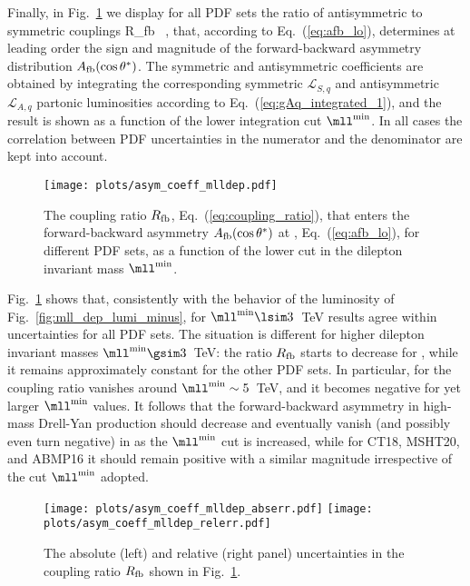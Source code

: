 Finally, in Fig.~\ref{fig:asym_coeff_mlldep} we display for all
PDF sets the
ratio of antisymmetric to symmetric couplings
\be
\label{eq:coupling_ratio}
R_{\rm fb}\equiv {} \, ,
\ee
that, according to
Eq.~(\ref{eq:afb_lo}), determines at leading order
the sign and magnitude
of the forward-backward asymmetry distribution $A_{\rm fb}(\cos\theta^*)$.
%
The symmetric and antisymmetric coefficients are obtained by integrating
the corresponding symmetric $\mathcal{L}_{S,q}$ and antisymmetric
$\mathcal{L}_{A,q}$ partonic luminosities according to
Eq.~(\ref{eq:gAq_integrated_1}), and the result is shown as a function of the lower integration cut $\mll^{\rm min}$.
%
In all cases the correlation between PDF uncertainties in the numerator and
the denominator are kept into account.

\begin{figure}[!t]
 \centering
 \texttt{[image: plots/asym\_coeff\_mlldep.pdf]}
 \caption{The coupling ratio $R_{\rm fb}$,
   Eq.~(\ref{eq:coupling_ratio}),
   that enters the forward-backward asymmetry $A_{\rm
     fb}(\cos\theta^*)$ at \lo,  Eq.~(\ref{eq:afb_lo}), for different PDF
   sets, as  a function of the lower cut in the dilepton
   invariant mass $\mll^{\rm min}$.
 }    
 \label{fig:asym_coeff_mlldep}
\end{figure}

Fig.~\ref{fig:asym_coeff_mlldep} shows that, consistently
with the behavior of the luminosity of
Fig.~\ref{fig:mll_dep_lumi_minus},  for $\mll^{{\rm
    min}}\lsim 3$~TeV results agree within uncertainties for all PDF
sets.
%
The situation is different for higher dilepton invariant masses $\mll^{{\rm min}}\gsim 3$~TeV:
the ratio $R_{\rm fb}$ starts to decrease for , while it
remains approximately  constant 
for the other  PDF sets. In particular, for  the coupling ratio
vanishes around $\mll^{{\rm min}}\sim5$~TeV, and it becomes negative
for yet larger   $\mll^{{\rm min}}$ values.
It follows that the forward-backward
asymmetry in high-mass Drell-Yan production should decrease  and
eventually vanish (and possibly even turn negative)
in  as the $\mll^{{\rm min}}$ cut is increased,
while for CT18, MSHT20, and ABMP16 it should remain positive
with a similar magnitude irrespective of the cut  $\mll^{{\rm min}}$ adopted.

\begin{figure}[!t]
 \centering
 \texttt{[image: plots/asym\_coeff\_mlldep\_abserr.pdf]}
 \texttt{[image: plots/asym\_coeff\_mlldep\_relerr.pdf]}
 \caption{The absolute (left) and relative (right panel) uncertainties
   in the coupling ratio $R_{\rm fb}$ shown in Fig.~\ref{fig:asym_coeff_mlldep}.
 }    
 \label{fig:asym_coeff_mlldep_err}
\end{figure}

